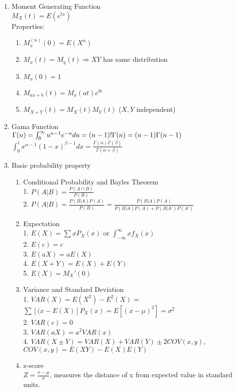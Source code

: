 \documentclass[10pt]{article}
\begin{document}
  
	\begin{multicols}{2}
		\begin{enumerate}
			\item Moment Generating Function\\
			$M_X(t) = E(e^{tx})$\\
			Properties:
			\begin{enumerate}
				\item $M_x^{(n)}(0) = E(X^n)$
				\item $M_x(t) = M_y(t) \Rightarrow X Y$ has same distribution
				\item $M_x(0) = 1$
				\item $M_{ax + b}(t) = M_x(at)e^{bt}$
				\item $M_{X+Y}(t) = M_X(t)M_Y(t)$ ($X,Y$ independent)
			\end{enumerate}
			
			\item Gama Function\\
			$\Gamma(n) = \int_{0}^{\infty}u^{n-1}e^{-u}du = (n-1)!\\ \Gamma(n) = (n-1)\Gamma(n-1)$\\
			$\int_{0}^{1}x^{\alpha-1}(1-x)^{\beta-1}dx = \frac{\Gamma(\alpha)\Gamma(\beta)}{\Gamma(\alpha + \beta)}$
			
			\item Basic probability property
			\begin{enumerate}
				\item Conditional Probability and Bayles Theorem\\
				1. $P(A|B) = \frac{P(A\cap B)}{P(B)}$\\
				2. $P(A|B) = \frac{P(B|A)P(A)}{P(B)} = \frac{P(B|A)P(A)}{P(B|A)P(A) + P(B|A')P(A')} $
				\item Expectation\\
				1. $E(X) = \sum xP_X(x)$ or $\int_{-\infty}^{\infty}xf_X(x)$\\
				2. $E(c) = c$\\
				3. $E(aX) = aE(X)$\\
				4. $E(X+Y) = E(X) + E(Y)$\\
				5. $E(X) = M_X'(0)$
				\item Variance and Standard Deviation\\
				1. $VAR(X) = E(X^2)-E^2(X)$ = $\sum[(x-E(X)]P_X(x) = E[(x-\mu)^2] = \sigma^2$\\
				2. $VAR(c) = 0$\\
				3. $VAR(aX) = a^2VAR(x)$\\
				4. $VAR(X\pm Y) = VAR(X) + VAR(Y) \pm 2COV(x,y)$, $COV(x,y) = E(XY)-E(X)E(Y)$
				\item z-score\\
				$Z = \frac{x-\mu}{\sigma}$, measures the distance of x from expected value in standard units.
			\end{enumerate}
			

\end{enumerate}
\end{multicols}
\end{document}
